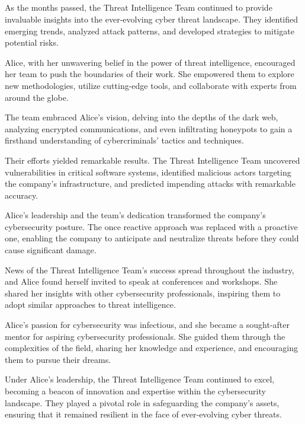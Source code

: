 \documentclass{./StyCls/MyArticle}
\begin{document}
\subsection{}


As the months passed, the Threat Intelligence Team continued to provide invaluable insights into the ever-evolving cyber threat landscape. They identified emerging trends, analyzed attack patterns, and developed strategies to mitigate potential risks.

Alice, with her unwavering belief in the power of threat intelligence, encouraged her team to push the boundaries of their work. She empowered them to explore new methodologies, utilize cutting-edge tools, and collaborate with experts from around the globe.

The team embraced Alice's vision, delving into the depths of the dark web, analyzing encrypted communications, and even infiltrating honeypots to gain a firsthand understanding of cybercriminals' tactics and techniques.

Their efforts yielded remarkable results. The Threat Intelligence Team uncovered vulnerabilities in critical software systems, identified malicious actors targeting the company's infrastructure, and predicted impending attacks with remarkable accuracy.

Alice's leadership and the team's dedication transformed the company's cybersecurity posture. The once reactive approach was replaced with a proactive one, enabling the company to anticipate and neutralize threats before they could cause significant damage.

News of the Threat Intelligence Team's success spread throughout the industry, and Alice found herself invited to speak at conferences and workshops. She shared her insights with other cybersecurity professionals, inspiring them to adopt similar approaches to threat intelligence.

Alice's passion for cybersecurity was infectious, and she became a sought-after mentor for aspiring cybersecurity professionals. She guided them through the complexities of the field, sharing her knowledge and experience, and encouraging them to pursue their dreams.

Under Alice's leadership, the Threat Intelligence Team continued to excel, becoming a beacon of innovation and expertise within the cybersecurity landscape. They played a pivotal role in safeguarding the company's assets, ensuring that it remained resilient in the face of ever-evolving cyber threats.
\end{document}
